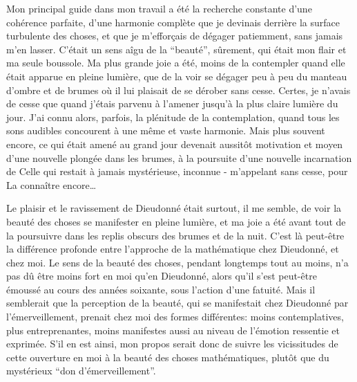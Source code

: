 Mon principal guide dans mon travail a été la recherche constante d'une cohérence parfaite, d'une harmonie complète que je devinais derrière la surface turbulente des choses, et que je m'efforçais de dégager patiemment, sans jamais m'en lasser. C'était un sens aîgu de la ``beauté'', sûrement, qui était mon flair et ma seule boussole. Ma plus grande joie a été, moins de la contempler quand elle était apparue en pleine lumière, que de la voir se dégager peu à peu du manteau d'ombre et de brumes où il lui plaisait de se dérober sans cesse. Certes, je n'avais de cesse que quand j'étais parvenu à l'amener jusqu'à la plus claire lumière du jour. J'ai connu alors, parfois, la plénitude de la contemplation, quand tous les sons audibles concourent à une même et vaste harmonie. Mais plus souvent encore, ce qui était amené au grand jour devenait aussitôt motivation et moyen d'une nouvelle plongée dans les brumes, à la poursuite d'une nouvelle incarnation de Celle qui restait à jamais mystérieuse, inconnue - m'appelant sans cesse, pour La connaître encore\ldots

Le plaisir et le ravissement de Dieudonné était surtout, il me semble, de voir la beauté des choses se manifester en pleine lumière, et ma joie a été avant tout de la poursuivre dans les replis obscurs des brumes et de la nuit. C'est là peut-être la différence profonde entre l'approche de la mathématique chez Dieudonné, et chez moi. Le sens de la beauté des choses, pendant longtemps tout au moins, n'a pas dû être moins fort en moi qu'en Dieudonné, alors qu'il s'est peut-être émoussé au cours des années soixante, sous l'action d'une fatuité. Mais il semblerait que la perception de la beauté, qui se manifestait chez Dieudonné par l'émerveillement, prenait chez moi des formes différentes: moins contemplatives, plus entreprenantes, moins manifestes aussi au niveau de l'émotion ressentie et exprimée. S'il en est ainsi, mon propos serait donc de suivre les vicissitudes de cette ouverture en moi à la beauté des choses mathématiques, plutôt que du mystérieux ``don d'émerveillement''.